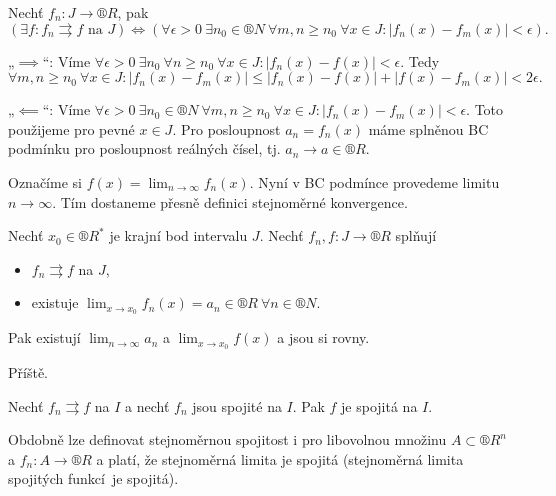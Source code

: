 \documentclass[12pt]{article}					%
\begin{document}
	\begin{veta}
		Nechť $f_n: J \rightarrow ®R$, pak
		$$ (\exists f: f_n \rightrightarrows f \text{ na } J) \Leftrightarrow (\forall \epsilon > 0\ \exists n_0 \in ®N\ \forall m, n ≥ n_0\ \forall x \in J: |f_n(x) - f_m(x)| < \epsilon). $$

		\begin{dukazin}
			„$\implies$“: Víme $\forall \epsilon > 0\ \exists n_0\ \forall n ≥ n_0\ \forall x \in J: |f_n(x) - f(x)| < \epsilon$. Tedy
			$$ \forall m, n ≥ n_0\ \forall x \in J: |f_n(x) - f_m(x)| ≤ |f_n(x) - f(x)| + |f(x) - f_m(x)| < 2\epsilon. $$

			„$\impliedby$“: Víme $\forall \epsilon > 0\ \exists n_0 \in ®N\ \forall m, n ≥ n_0\ \forall x \in J: |f_n(x) - f_m(x)| < \epsilon$. Toto použijeme pro pevné $x \in J$. Pro posloupnost $a_n = f_n(x)$ máme splněnou BC podmínku pro posloupnost reálných čísel, tj. $a_n \rightarrow a \in ®R$.

			Označíme si $f(x) = \lim_{n \rightarrow ∞} f_n(x)$. Nyní v BC podmínce provedeme limitu $n \rightarrow ∞$. Tím dostaneme přesně definici stejnoměrné konvergence.
		\end{dukazin}
	\end{veta}

	\begin{veta}
		Nechť $x_0 \in ®R^*$ je krajní bod intervalu $J$. Nechť $f_n, f: J \rightarrow ®R$ splňují

		\begin{itemize}
			\item $f_n \rightrightarrows f$ na $J$,
			\item existuje $\lim_{x \rightarrow x_0} f_n(x) = a_n \in ®R\ \forall n \in ®N$.
		\end{itemize}

		Pak existují $\lim_{n \rightarrow ∞} a_n$ a $\lim_{x \rightarrow x_0} f(x)$ a jsou si rovny.

		\begin{dukazin}
			Příště.
		\end{dukazin}
	\end{veta}

	\begin{dusledek}
		Nechť $f_n \rightrightarrows f$ na $I$ a nechť $f_n$ jsou spojité na $I$. Pak $f$ je spojitá na $I$.
	\end{dusledek}

	\begin{poznamka}
		Obdobně lze definovat stejnoměrnou spojitost i pro libovolnou množinu $A \subset ®R^n$ a $f_n: A \rightarrow ®R$ a platí, že stejnoměrná limita je spojitá (stejnoměrná limita spojitých funkcí je spojitá).
	\end{poznamka}
\end{document}
